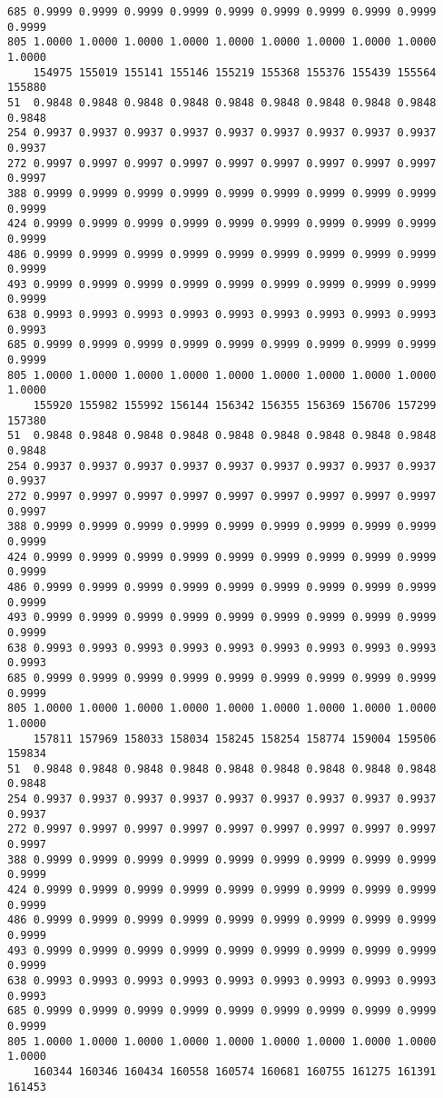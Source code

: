 \documentclass[
]{report}
\begin{document}
\begin{verbatim}
685 0.9999 0.9999 0.9999 0.9999 0.9999 0.9999 0.9999 0.9999 0.9999 0.9999
805 1.0000 1.0000 1.0000 1.0000 1.0000 1.0000 1.0000 1.0000 1.0000 1.0000
    154975 155019 155141 155146 155219 155368 155376 155439 155564 155880
51  0.9848 0.9848 0.9848 0.9848 0.9848 0.9848 0.9848 0.9848 0.9848 0.9848
254 0.9937 0.9937 0.9937 0.9937 0.9937 0.9937 0.9937 0.9937 0.9937 0.9937
272 0.9997 0.9997 0.9997 0.9997 0.9997 0.9997 0.9997 0.9997 0.9997 0.9997
388 0.9999 0.9999 0.9999 0.9999 0.9999 0.9999 0.9999 0.9999 0.9999 0.9999
424 0.9999 0.9999 0.9999 0.9999 0.9999 0.9999 0.9999 0.9999 0.9999 0.9999
486 0.9999 0.9999 0.9999 0.9999 0.9999 0.9999 0.9999 0.9999 0.9999 0.9999
493 0.9999 0.9999 0.9999 0.9999 0.9999 0.9999 0.9999 0.9999 0.9999 0.9999
638 0.9993 0.9993 0.9993 0.9993 0.9993 0.9993 0.9993 0.9993 0.9993 0.9993
685 0.9999 0.9999 0.9999 0.9999 0.9999 0.9999 0.9999 0.9999 0.9999 0.9999
805 1.0000 1.0000 1.0000 1.0000 1.0000 1.0000 1.0000 1.0000 1.0000 1.0000
    155920 155982 155992 156144 156342 156355 156369 156706 157299 157380
51  0.9848 0.9848 0.9848 0.9848 0.9848 0.9848 0.9848 0.9848 0.9848 0.9848
254 0.9937 0.9937 0.9937 0.9937 0.9937 0.9937 0.9937 0.9937 0.9937 0.9937
272 0.9997 0.9997 0.9997 0.9997 0.9997 0.9997 0.9997 0.9997 0.9997 0.9997
388 0.9999 0.9999 0.9999 0.9999 0.9999 0.9999 0.9999 0.9999 0.9999 0.9999
424 0.9999 0.9999 0.9999 0.9999 0.9999 0.9999 0.9999 0.9999 0.9999 0.9999
486 0.9999 0.9999 0.9999 0.9999 0.9999 0.9999 0.9999 0.9999 0.9999 0.9999
493 0.9999 0.9999 0.9999 0.9999 0.9999 0.9999 0.9999 0.9999 0.9999 0.9999
638 0.9993 0.9993 0.9993 0.9993 0.9993 0.9993 0.9993 0.9993 0.9993 0.9993
685 0.9999 0.9999 0.9999 0.9999 0.9999 0.9999 0.9999 0.9999 0.9999 0.9999
805 1.0000 1.0000 1.0000 1.0000 1.0000 1.0000 1.0000 1.0000 1.0000 1.0000
    157811 157969 158033 158034 158245 158254 158774 159004 159506 159834
51  0.9848 0.9848 0.9848 0.9848 0.9848 0.9848 0.9848 0.9848 0.9848 0.9848
254 0.9937 0.9937 0.9937 0.9937 0.9937 0.9937 0.9937 0.9937 0.9937 0.9937
272 0.9997 0.9997 0.9997 0.9997 0.9997 0.9997 0.9997 0.9997 0.9997 0.9997
388 0.9999 0.9999 0.9999 0.9999 0.9999 0.9999 0.9999 0.9999 0.9999 0.9999
424 0.9999 0.9999 0.9999 0.9999 0.9999 0.9999 0.9999 0.9999 0.9999 0.9999
486 0.9999 0.9999 0.9999 0.9999 0.9999 0.9999 0.9999 0.9999 0.9999 0.9999
493 0.9999 0.9999 0.9999 0.9999 0.9999 0.9999 0.9999 0.9999 0.9999 0.9999
638 0.9993 0.9993 0.9993 0.9993 0.9993 0.9993 0.9993 0.9993 0.9993 0.9993
685 0.9999 0.9999 0.9999 0.9999 0.9999 0.9999 0.9999 0.9999 0.9999 0.9999
805 1.0000 1.0000 1.0000 1.0000 1.0000 1.0000 1.0000 1.0000 1.0000 1.0000
    160344 160346 160434 160558 160574 160681 160755 161275 161391 161453

\end{verbatim}
\end{document}
